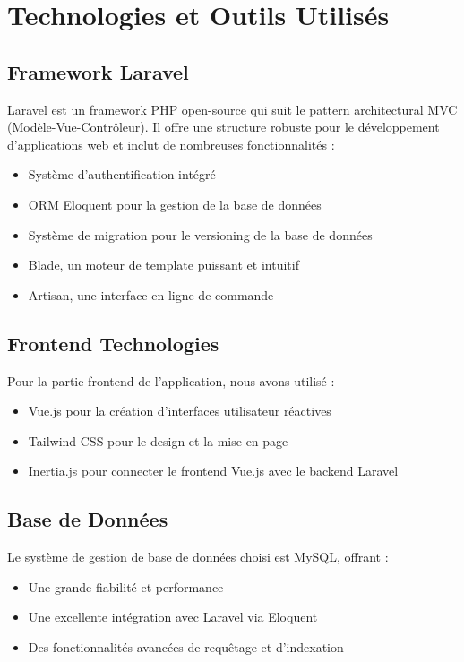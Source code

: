 \documentclass{report}
\begin{document}
\chapter{Technologies et Outils Utilisés}

\section{Framework Laravel}
Laravel est un framework PHP open-source qui suit le pattern architectural MVC (Modèle-Vue-Contrôleur). Il offre une structure robuste pour le développement d'applications web et inclut de nombreuses fonctionnalités :

\begin{itemize}
    \item Système d'authentification intégré
    \item ORM Eloquent pour la gestion de la base de données
    \item Système de migration pour le versioning de la base de données
    \item Blade, un moteur de template puissant et intuitif
    \item Artisan, une interface en ligne de commande
\end{itemize}

\section{Frontend Technologies}
Pour la partie frontend de l'application, nous avons utilisé :

\begin{itemize}
    \item Vue.js pour la création d'interfaces utilisateur réactives
    \item Tailwind CSS pour le design et la mise en page
    \item Inertia.js pour connecter le frontend Vue.js avec le backend Laravel
\end{itemize}

\section{Base de Données}
Le système de gestion de base de données choisi est MySQL, offrant :
\begin{itemize}
    \item Une grande fiabilité et performance
    \item Une excellente intégration avec Laravel via Eloquent
    \item Des fonctionnalités avancées de requêtage et d'indexation
\end{itemize}
\end{document}
